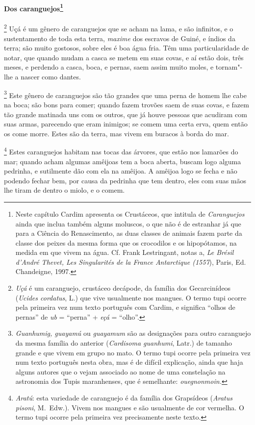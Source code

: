 \begin{linenumbers}
\paragraph[Dos caranguejos]{Dos caranguejos\protect\footnote{ Neste capítulo Cardim apresenta
os Crustáceos, que intitula de \textit{Caranguejos} ainda que inclua
também alguns moluscos, o que não é de estranhar já que para a Ciência
do Renascimento, as duas classes de animais fazem parte da classe dos
peixes da mesma forma que os crocodilos e os hipopótamos, na medida em
que vivem na água. Cf. Frank Lestringant, notas a, \textit{Le Brésil
d'André Thevet, Les Singularités de la France Antarctique (1557}), Paris, Ed. Chandeigne, 1997.}} \quad
{}\footnote{ \textit{Uçá} é um caranguejo,
crustáceo decápode, da família dos Gecarcinídeos (\textit{Ucides
cordatus}, L.) que vive usualmente nos mangues. O termo tupi ocorre
pela primeira vez num texto português com Cardim, e significa ``olhos
de pernas'' de \textit{ub} = ``perna'' + \textit{eçá} = ``olho''.} 
Uçá é um gênero de caranguejos que se acham na
lama, e são infinitos, e o sustentamento de toda esta terra, \textit{maxime} dos
escravos de Guiné, e índios da terra; são muito gostosos, sobre eles é
boa água fria. Têm uma particularidade de notar, que quando mudam a
casca se metem em suas covas, e aí estão dois, três meses, e perdendo a
casca, boca, e pernas, saem assim muito moles, e tornam"-lhe a nascer como dantes.

\footnote{ \textit{Guanhumig, guayamú} ou
\textit{guayamum} são as designações para outro caranguejo da mesma
família do anterior (\textit{Cardisoma guanhumi}, Latr.) de tamanho
grande e que vivem em grupo no mato. O termo tupi ocorre pela primeira
vez num texto português nesta obra, mas é de difícil explicação, ainda
que haja alguns autores que o vejam associado ao nome de uma
constelação na astronomia dos Tupis maranhenses, que é semelhante:
\textit{ouegnonmoin.}} Este gênero de caranguejos são tão
grandes que uma perna de homem lhe cabe na boca; são bons para comer;
quando fazem trovões saem de suas covas, e fazem tão grande matinada
uns com os outros, que já houve pessoas que acudiram com suas armas,
parecendo que eram inimigos; se comem uma certa erva, quem então os
come morre. Estes são da terra, mas vivem em buracos à borda do mar.

\footnote{ \textit{Aratú}: esta variedade de caranguejo
é da família dos Grapsídeos (\textit{Aratus pisoni}, M.~Edw.). Vivem nos
mangues e são usualmente de cor vermelha. O termo tupi ocorre pela
primeira vez precisamente neste texto.} Estes caranguejos
habitam nas tocas das árvores, que estão nos lamarões do mar; quando
acham algumas amêijoas tem a boca aberta, buscam logo alguma pedrinha,
e sutilmente dão com ela na amêijoa. A amêijoa logo se fecha e não
podendo fechar bem, por causa da pedrinha que tem dentro, eles com suas
mãos lhe tiram de dentro o miolo, e o comem.


\end{linenumbers}

